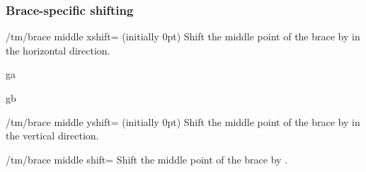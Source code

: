 \subsubsection{Brace-specific shifting}\label{sec:custom:transformations:brace}
\begin{key}{/tm/brace middle xshift= (initially 0pt)}
  Shift the middle point of the brace by  in the horizontal direction.
\end{key}
\begin{codeexample}[]
\begin{tmline}[staff offset=1.7cm]
\begin{tmstaff}{g}{a}\end{tmstaff}%
\begin{tmstaff}{g}{b}\end{tmstaff}%
%
\end{tmline}
\end{codeexample}
\begin{key}{/tm/brace middle yshift= (initially 0pt)}
  Shift the middle point of the brace by  in the vertical direction.
\end{key}
\begin{key}{/tm/brace middle shift=}
  Shift the middle point of the brace by .
\end{key}
